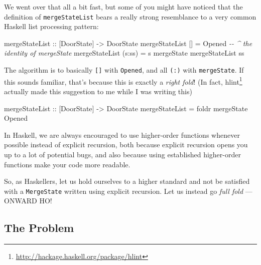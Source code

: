 \documentclass[]{article}
\newenvironment{Shaded}{}{}
\newcommand{\CommentTok}[1]{\textcolor[rgb]{0.38,0.63,0.69}{\textit{#1}}}
\newcommand{\DataTypeTok}[1]{\textcolor[rgb]{0.56,0.13,0.00}{#1}}
\newcommand{\FunctionTok}[1]{\textcolor[rgb]{0.02,0.16,0.49}{#1}}
\newcommand{\NormalTok}[1]{#1}
\newcommand{\OperatorTok}[1]{\textcolor[rgb]{0.40,0.40,0.40}{#1}}
\newcommand{\OtherTok}[1]{\textcolor[rgb]{0.00,0.44,0.13}{#1}}
\renewcommand{\href}[2]{#2\footnote{\url{#1}}}
\begin{document}
We went over that all a bit fast, but some of you might have noticed that the
definition of \texttt{mergeStateList} bears a really strong resemblance to a
very common Haskell list processing pattern:

\begin{Shaded}
\begin{Highlighting}[]
\OtherTok{mergeStateList ::}\NormalTok{ [}\DataTypeTok{DoorState}\NormalTok{] }\OtherTok{{-}\textgreater{}} \DataTypeTok{DoorState}
\NormalTok{mergeStateList []     }\OtherTok{=} \DataTypeTok{Opened}               \CommentTok{{-}{-} \^{} the identity of mergeState}
\NormalTok{mergeStateList (s}\OperatorTok{:}\NormalTok{ss) }\OtherTok{=}\NormalTok{ s }\OtherTok{\textasciigrave{}mergeState\textasciigrave{}}\NormalTok{ mergeStateList ss}
\end{Highlighting}
\end{Shaded}

The algorithm is to basically \texttt{{[}{]}} with \texttt{Opened}, and all
\texttt{(:)} with \texttt{mergeState}. If this sounds familiar, that's because
this is exactly a \emph{right fold}! (In fact,
\href{http://hackage.haskell.org/package/hlint}{hlint} actually made this
suggestion to me while I was writing this)

\begin{Shaded}
\begin{Highlighting}[]
\OtherTok{mergeStateList ::}\NormalTok{ [}\DataTypeTok{DoorState}\NormalTok{] }\OtherTok{{-}\textgreater{}} \DataTypeTok{DoorState}
\NormalTok{mergeStateList }\OtherTok{=} \FunctionTok{foldr}\NormalTok{ mergeState }\DataTypeTok{Opened}
\end{Highlighting}
\end{Shaded}

In Haskell, we are always encouraged to use higher-order functions whenever
possible instead of explicit recursion, both because explicit recursion opens
you up to a lot of potential bugs, and also because using established
higher-order functions make your code more readable.

So, as Haskellers, let us hold ourselves to a higher standard and not be
satisfied with a \texttt{MergeState} written using explicit recursion. Let us
instead go \emph{full fold} --- ONWARD HO!

\subsection{The Problem}\label{the-problem}
\end{document}
